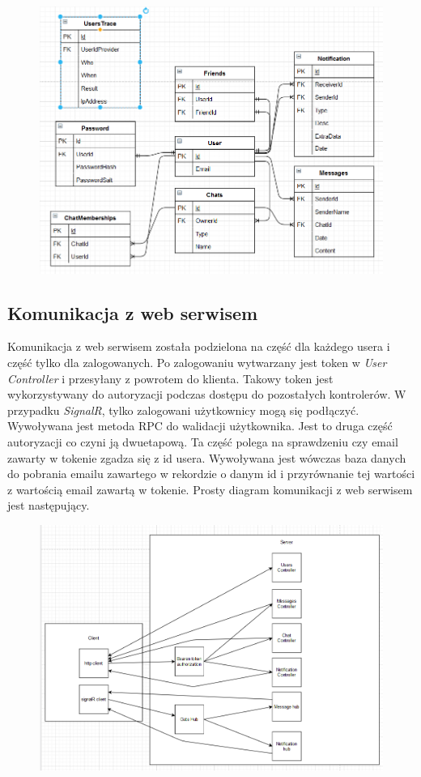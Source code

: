 \documentclass[12pt,a4paper]{article}
\begin{document}
\begin{figure}[H]
	\centering
	\includegraphics[width=0.7\linewidth]{diagrambazydanycj}
	\caption{}
	\label{fig:diagrambazydanycj}
\end{figure}


\subsection{Komunikacja z web serwisem} %
\hspace*{0.7cm} Komunikacja z web serwisem została podzielona na część dla każdego usera i część tylko dla zalogowanych.
Po zalogowaniu wytwarzany jest token w \textit{User Controller} i przesyłany z powrotem do klienta. Takowy token jest wykorzystywany do autoryzacji podczas dostępu do pozostałych kontrolerów. W przypadku \textit{SignalR}, tylko zalogowani użytkownicy mogą się podłączyć. Wywoływana jest metoda RPC do walidacji użytkownika. Jest to druga część autoryzacji co czyni ją dwuetapową. Ta część polega na sprawdzeniu czy email zawarty w tokenie zgadza się z id usera. Wywoływana jest wówczas baza danych do pobrania emailu zawartego w rekordzie o danym id i przyrównanie tej wartości z wartością email zawartą w tokenie. Prosty diagram komunikacji z web serwisem jest następujący.

\begin{figure}[H]
	\centering
	\includegraphics[width=1\linewidth]{komunikacjazwebserwisem}
	\caption{}
	\label{fig:komunikacjazwebserwisem}
\end{figure}
\end{document}
